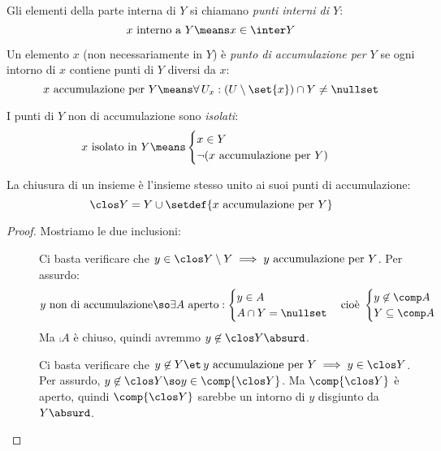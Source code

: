 \begin{defn}
	Gli elementi della parte interna di $Y$ si chiamano \emph{punti interni di $Y$}:
	\[x\text{ interno a }Y\means x\in\inter Y\]
\end{defn}

\begin{defn}
	Un elemento $x$ (non necessariamente in $Y$) è \emph{punto di accumulazione per $Y$} se ogni intorno di $x$ contiene punti di $Y$ diversi da $x$:
	\[x\text{ accumulazione per }Y\means\forall\,U_x:(U\setminus\set{x})\cap Y\neq\nullset\]
\end{defn}

\begin{defn}
	I punti di $Y$ non di accumulazione sono \emph{isolati}:
	\[x\text{ isolato in }Y\means
	\begin{cases}
		x\in Y\\
		\neg(x\text{ accumulazione per }Y)
	\end{cases}\]
\end{defn}

\begin{lemma}
	\label{th:chiusuraacc}
	La chiusura di un insieme è l'insieme stesso unito ai suoi punti di accumulazione:
	\[\clos Y=Y\cup\setdef{x\text{ accumulazione per }Y}\]
\end{lemma}

\begin{proof}
	Mostriamo le due inclusioni:
	\begin{description}
		\item[\proofsubseteq]
		Ci basta verificare che $y\in\clos Y\setminus Y\implies y\text{ accumulazione per }Y$.
		Per assurdo:
		\[y\text{ non di accumulazione}\so
		\exists A\text{ aperto}:
		\begin{cases}
			y\in A\\
			A\cap Y=\nullset
		\end{cases}\text{cioè }
		\begin{cases}
			y\not\in\comp A\\
			Y\subseteq\comp A
		\end{cases}\]
		Ma $\comp A$ è chiuso, quindi avremmo $y\not\in\clos Y\absurd$.
		\item[\proofsupseteq]
		Ci basta verificare che $y\not\in Y\et\, y\text{ accumulazione per }Y\implies y\in\clos Y$.
		Per assurdo, $y\not\in\clos Y\so y\in\comp{\clos Y}$. Ma $\comp{\clos Y}$ è aperto, quindi $\comp{\clos Y}$ sarebbe un intorno di $y$ disgiunto da $Y\absurd$. \qedhere
	\end{description}
\end{proof}

